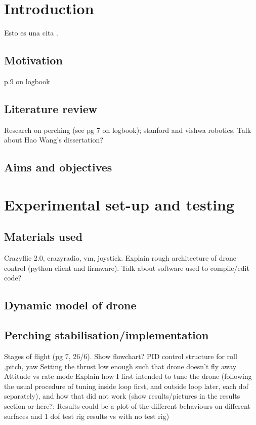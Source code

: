 \documentclass[12pt,a4paper,oneside]{article}
\begin{document}
\setcounter{page}{2}

\tableofcontents

\pagebreak

\listoffigures

\pagebreak

\listoftables

\pagebreak
\section{Introduction}
Esto es una cita \cite{avitabile}.
\subsection{Motivation}
p.9 on logbook
\subsection{Literature review}\label{litrev}
Research on perching (see pg 7 on logbook); stanford and vishwa robotics. Talk about Hao Wang's dissertation?
\subsection{Aims and objectives}

\section{Experimental set-up and testing}
\subsection{Materials used}
	Crazyflie 2.0, crazyradio, vm, joystick. Explain rough architecture of drone control (python client and firmware). Talk about software used to compile/edit code?
\subsection{Dynamic model of drone}
\subsection{Perching stabilisation/implementation}
Stages of flight (pg 7, 26/6). Show flowchart?
PID control structure for roll ,pitch, yaw
Setting the thrust low enough such that drone doesn't fly away
Attitude vs rate mode
Explain how I first intended to tune the drone (following the usual procedure of tuning inside loop first, and outside loop later, each dof separately), and how that did not work (show results/pictures in the results section or here?: Results could be a plot of the different behaviours on different surfaces and 1 dof test rig results vs with no test rig) 
\end{document}
